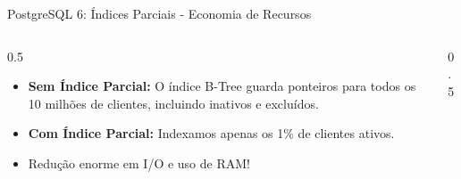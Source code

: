 \documentclass[9pt]{beamer}
\begin{document}
\begin{frame}{PostgreSQL 6: Índices Parciais - Economia de Recursos}
    \begin{columns}
        \begin{column}{0.5\textwidth}
            \begin{itemize}
                \item \textbf{Sem Índice Parcial:}
                O índice B-Tree guarda ponteiros para todos os 10 milhões de clientes, incluindo inativos e excluídos.
                \vspace{0.2cm}
                \item \textbf{Com Índice Parcial:}
                Indexamos apenas os 1\% de clientes ativos.
                \item Redução enorme em I/O e uso de RAM!
            \end{itemize}
        \end{column}
        \begin{column}{0.5\textwidth}
            \begin{center}
            \end{center}
        \end{column}
    \end{columns}
\end{frame}
\end{document}
